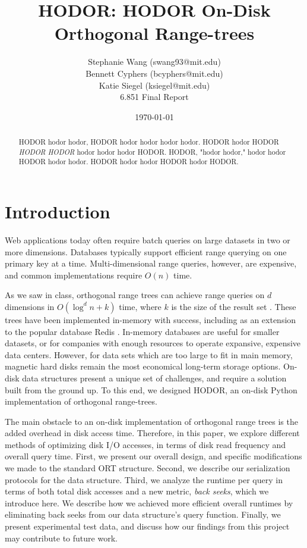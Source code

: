\documentclass[11pt, oneside]{article}
\title{HODOR: HODOR On-Disk Orthogonal Range-trees}
\author{Stephanie Wang (swang93@mit.edu)\\
Bennett Cyphers (bcyphers@mit.edu)\\
Katie Siegel (ksiegel@mit.edu)\\[2ex]
6.851 Final Report}
\date{\today}
\begin{document}
\maketitle

\vfill

\begin{abstract}

    HODOR hodor hodor, HODOR hodor hodor hodor hodor. HODOR hodor HODOR
    \textit{HODOR HODOR} hodor hodor hodor HODOR. HODOR, "hodor hodor," hodor
    hodor HODOR hodor hodor. HODOR hodor hodor HODOR hodor HODOR.

\end{abstract}

\clearpage

\section{Introduction}

Web applications today often require batch queries on large datasets in two or
more dimensions. Databases typically support efficient range querying on one
primary key at a time. Multi-dimensional range queries, however, are expensive,
and common implementations require $O(n)$ time. 

As we saw in class, orthogonal range trees can achieve range queries on $d$
dimensions in $O(\log^{d} n + k)$ time, where $k$ is the size of the result set
\cite{lecture}. These trees have been implemented in-memory with success,
including as an extension to the popular database Redis \cite{redis}. In-memory
databases are useful for smaller datasets, or for companies with enough
resources to operate expansive, expensive data centers. However, for data sets
which are too large to fit in main memory, magnetic hard disks remain the most
economical long-term storage options. On-disk data structures present a unique
set of challenges, and require a solution built from the ground up. To this end,
we designed HODOR, an on-disk Python implementation of orthogonal range-trees. 

The main obstacle to an on-disk implementation of orthogonal range trees is the
added overhead in disk access time. Therefore, in this paper, we explore
different methods of optimizing disk I/O accesses, in terms of disk read
frequency and overall query time. First, we present our overall design, and
specific modifications we made to the standard ORT structure. Second, we
describe our serialization protocols for the data structure. Third, we analyze
the runtime per query in terms of both total disk accesses and a new metric,
\textit{back seeks}, which we introduce here. We describe how we achieved more
efficient overall runtimes by eliminating back seeks from our data structure's
query function.  Finally, we present experimental test data, and discuss how our
findings from this project may contribute to future work.
\end{document}
